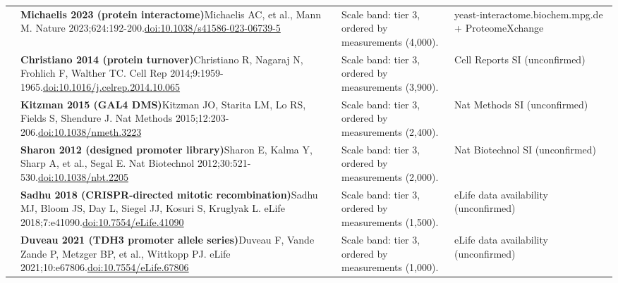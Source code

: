 \begin{landscape}
\begin{longtable}{@{}r@{\hspace{4pt}} L{86mm} L{92mm} L{62mm}@{}}
 & \textbf{Michaelis 2023 (protein interactome)}\newline Michaelis AC, et al., Mann M. Nature 2023;624:192-200.\newline \href{https://doi.org/10.1038/s41586-023-06739-5}{doi:10.1038/\allowbreak s41586-023-06739-5} & Scale band: tier 3, ordered by measurements (4,000). & yeast-interactome.biochem.mpg.de + ProteomeXchange \\
 & \textbf{Christiano 2014 (protein turnover)}\newline Christiano R, Nagaraj N, Frohlich F, Walther TC. Cell Rep 2014;9:1959-1965.\newline \href{https://doi.org/10.1016/j.celrep.2014.10.065}{doi:10.1016/\allowbreak j.celrep.2014.10.065} & Scale band: tier 3, ordered by measurements (3,900). & Cell Reports SI (unconfirmed) \\
 & \textbf{Kitzman 2015 (GAL4 DMS)}\newline Kitzman JO, Starita LM, Lo RS, Fields S, Shendure J. Nat Methods 2015;12:203-206.\newline \href{https://doi.org/10.1038/nmeth.3223}{doi:10.1038/\allowbreak nmeth.3223} & Scale band: tier 3, ordered by measurements (2,400). & Nat Methods SI (unconfirmed) \\
 & \textbf{Sharon 2012 (designed promoter library)}\newline Sharon E, Kalma Y, Sharp A, et al., Segal E. Nat Biotechnol 2012;30:521-530.\newline \href{https://doi.org/10.1038/nbt.2205}{doi:10.1038/\allowbreak nbt.2205} & Scale band: tier 3, ordered by measurements (2,000). & Nat Biotechnol SI (unconfirmed) \\
 & \textbf{Sadhu 2018 (CRISPR-directed mitotic recombination)}\newline Sadhu MJ, Bloom JS, Day L, Siegel JJ, Kosuri S, Kruglyak L. eLife 2018;7:e41090.\newline \href{https://doi.org/10.7554/eLife.41090}{doi:10.7554/\allowbreak eLife.41090} & Scale band: tier 3, ordered by measurements (1,500). & eLife data availability (unconfirmed) \\
 & \textbf{Duveau 2021 (TDH3 promoter allele series)}\newline Duveau F, Vande Zande P, Metzger BP, et al., Wittkopp PJ. eLife 2021;10:e67806.\newline \href{https://doi.org/10.7554/eLife.67806}{doi:10.7554/\allowbreak eLife.67806} & Scale band: tier 3, ordered by measurements (1,000). & eLife data availability (unconfirmed) \\

\end{longtable}
\end{landscape}
